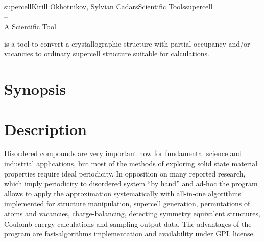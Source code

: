 \documentclass[a4paper,english]{article}
\begin{document}
\newcommand{\Dd}{-{}-}

\begin{Name}{1}{supercell}{Kirill Okhotnikov, Sylvian Cadars}{Scientific Tools}{supercell\\--\\ A Scientific Tool}

   is a tool to convert a crystallographic structure with partial occupancy and/or vacancies to  ordinary supercell structure suitable for calculations.
\end{Name}

\section{Synopsis}

\begin{Description}\setlength{\itemsep}{0cm}
\item[]
 \Opt{-h, \Dd help}
\item[]
   
\item[]
  \OptArg{\Dd input=}{input-file}

\end{Description}

\section{Description}
Disordered compounds are very important now for fundamental science and industrial applications, but most of the methods of exploring solid state material properties require ideal periodicity. In opposition on many reported research, which imply periodicity to disordered system ``by hand'' and ad-hoc the program  allows to apply the approximation systematically with all-in-one algorithms implemented for structure manipulation, supercell generation, permutations of atoms and vacancies, charge-balancing, detecting symmetry equivalent structures, Coulomb energy calculations and sampling output data. The advantages of the program are fast-algorithms implementation and availability under GPL license. 
\end{document}
